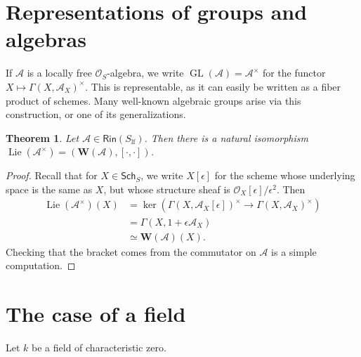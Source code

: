 \documentclass{article}
\DeclareMathOperator{\GL}{GL}
\DeclareMathOperator{\lie}{Lie}
\newcommand{\bW}{\mathbf{W}}
\newcommand{\sA}{\mathscr{A}}
\newcommand{\sO}{\mathscr{O}}
\newcommand{\lf}[1]{{#1}_\mathrm{lf}}
\newcommand{\ring}{\mathsf{Rin}}
\newcommand{\scheme}{\mathsf{Sch}}
\newtheorem{theorem}[subsection]{Theorem}
\begin{document}
\section{Representations of groups and algebras}

If $\sA$ is a locally free $\sO_S$-algebra, we write $\GL(\sA)=\sA^\times$ for 
the functor $X\mapsto \Gamma(X,\sA_X)^\times$. This is representable, as it can 
easily be written as a fiber product of schemes. Many well-known algebraic 
groups arise via this construction, or one of its generalizations. 

\begin{theorem}
Let $\sA\in \ring(\lf S)$. Then there is a natural isomorphism 
$\lie(\sA^\times) = (\bW(\sA),[\cdot,\cdot])$. 
\end{theorem}
\begin{proof}
Recall that for $X\in \scheme_S$, we write $X[\epsilon]$ for the scheme whose 
underlying space is the same as $X$, but whose structure sheaf is 
$\sO_X[\epsilon]/\epsilon^2$. Then 
\begin{align*}
	\lie(\sA^\times)(X) 
		&= \ker(\Gamma(X,\sA_X[\epsilon])^\times\to \Gamma(X,\sA_X)^\times) \\
		&= \Gamma(X,1+\epsilon \sA_X) \\
		&\simeq \bW(\sA)(X) .
\end{align*}
Checking that the bracket comes from the commutator on $\sA$ is a simple 
computation. 
\end{proof}





\section{The case of a field}

Let $k$ be a field of characteristic zero. 
\end{document}
